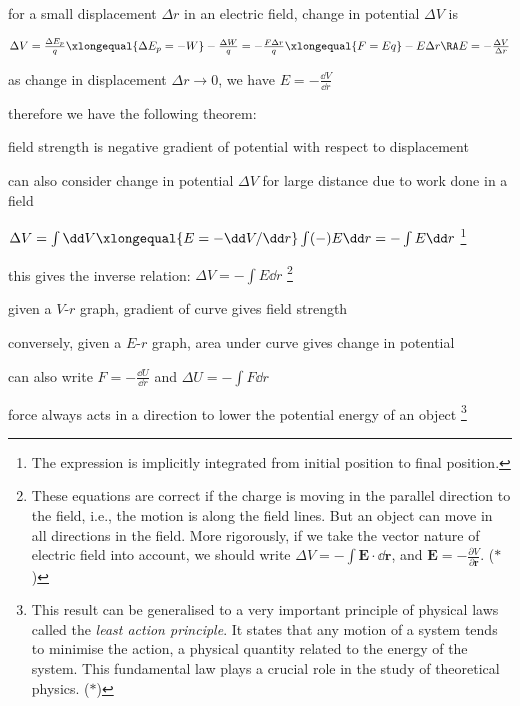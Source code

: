 for a small displacement $\Delta r$ in an electric field, change in potential $\Delta V$ is

{

\centering

$\Delta V = \frac{\Delta E_p}{q} \xlongequal{\Delta E_p=-W} - \frac{\Delta W}{q} = - \frac{F \Delta r}{q} \xlongequal{F=Eq} - E \Delta r \RA E = - \frac{\Delta V}{\Delta r}$

}

\eqyskip as change in displacement $\Delta r \to 0$, we have $\boxed{E = - \frac{\dd V}{\dd r}}$

therefore we have the following theorem:

\begin{ilight}
	\centering field strength is negative gradient of potential with respect to displacement
\end{ilight}

\newpage

can also consider change in potential $\Delta V$ for large distance due to work done in a field

{
	
\centering

$\Delta V= \int \dd V \xlongequal{E = -\dd V/\dd r}  \int (-)E \dd r =  -\int E \dd r$
\footnote{The expression is implicitly integrated from initial position to final position.}

}

\eqyskip this gives the inverse relation: $\boxed{\Delta V = -\int E \dd r}$
\footnote{These equations are correct if the charge is moving in the parallel direction to the field, i.e., the motion is along the field lines. But an object can move in all directions in the field. More rigorously, if we take the vector nature of electric field into account, we should write $\Delta V = - \int \mathbf{E}\cdot\dd\mathbf{r}$, and $\mathbf{E} = - \frac{\partial V}{\partial \mathbf{r}}$. ($\ast$)}

\cmt given a $V$-$r$ graph, gradient of curve gives field strength

conversely, given a $E$-$r$ graph, area under curve gives change in potential

\cmt can also write $F = - \frac{\dd U}{\dd r}$ and $\Delta U = -\int F \dd r$

force always acts in a direction to lower the potential energy of an object
\footnote{This result can be generalised to a very important principle of physical laws called the \emph{least action principle}. It states that any motion of a system tends to minimise the action, a physical quantity related to the energy of the system. This fundamental law plays a crucial role in the study of theoretical physics. ($\ast$)}

